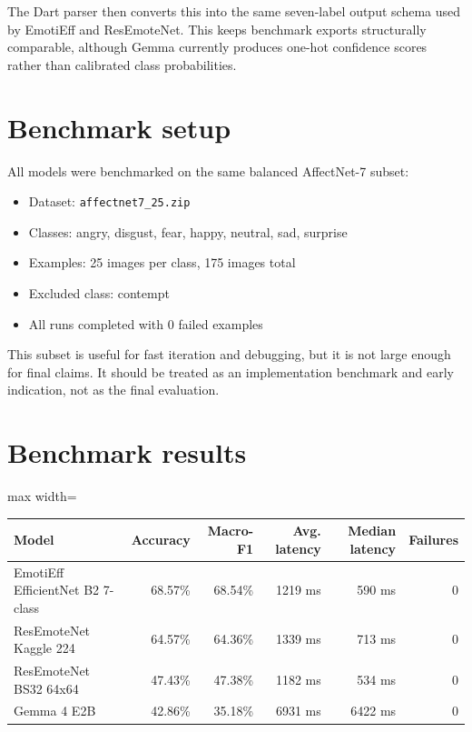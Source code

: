 \documentclass[11pt,a4paper]{article}
\begin{document}
The Dart parser then converts this into the same seven-label output schema used by EmotiEff and ResEmoteNet. This keeps benchmark exports structurally comparable, although Gemma currently produces one-hot confidence scores rather than calibrated class probabilities.

\section*{Benchmark setup}
All models were benchmarked on the same balanced AffectNet-7 subset:
\begin{itemize}[leftmargin=*]
  \item Dataset: \texttt{affectnet7\_25.zip}
  \item Classes: angry, disgust, fear, happy, neutral, sad, surprise
  \item Examples: 25 images per class, 175 images total
  \item Excluded class: contempt
  \item All runs completed with 0 failed examples
\end{itemize}

This subset is useful for fast iteration and debugging, but it is not large enough for final claims. It should be treated as an implementation benchmark and early indication, not as the final evaluation.

\section*{Benchmark results}
\begin{center}
\begin{adjustbox}{max width=\textwidth}
\begin{tabular}{lrrrrr}
\toprule
Model & Accuracy & Macro-F1 & Avg. latency & Median latency & Failures \\
\midrule
EmotiEff EfficientNet B2 7-class & 68.57\% & 68.54\% & 1219 ms & 590 ms & 0 \\
ResEmoteNet Kaggle 224 & 64.57\% & 64.36\% & 1339 ms & 713 ms & 0 \\
ResEmoteNet BS32 64x64 & 47.43\% & 47.38\% & 1182 ms & 534 ms & 0 \\
Gemma 4 E2B & 42.86\% & 35.18\% & 6931 ms & 6422 ms & 0 \\
\bottomrule
\end{tabular}
\end{adjustbox}
\end{center}
\end{document}
